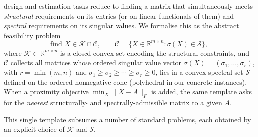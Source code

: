 \documentclass[journal]{IEEEtran}
\newcommand{\R}{\mathbb{R}}
\newcommand{\sgm}{\sigma}
\newcommand{\spec}{\mathcal{S}}
\newcommand{\Kset}{\mathcal{K}}
\newcommand{\Cset}{\mathcal{C}}
\begin{document}
 design and estimation tasks reduce to finding a
matrix that simultaneously meets \emph{structural} requirements on its
entries (or on linear functionals of them) and \emph{spectral}
requirements on its singular values. We formalise this as the abstract
feasibility problem
\begin{equation}\label{eq:feas}
\text{find } X \in \Kset \cap \Cset,
\qquad
\Cset = \{ X \in \R^{m \times n} : \sgm(X) \in \spec \},
\end{equation}
where $\Kset \subset \R^{m \times n}$ is a closed convex set encoding the
structural constraints, and $\Cset$ collects all matrices whose ordered
singular value vector
$\sgm(X) = (\sgm_1, \dots, \sgm_r)$, with $r = \min(m,n)$ and
$\sgm_1 \ge \sgm_2 \ge \cdots \ge \sgm_r \ge 0$, lies in a convex
spectral set $\spec$ defined on the ordered nonnegative cone (polyhedral
in our concrete instances). When a proximity objective
$\min_X \|X - A\|_F$ is added, the same template asks for the
\emph{nearest} structurally- and spectrally-admissible matrix to a
given $A$.

This single template subsumes a number of standard problems, each
obtained by an explicit choice of $\Kset$ and $\spec$.
\end{document}
